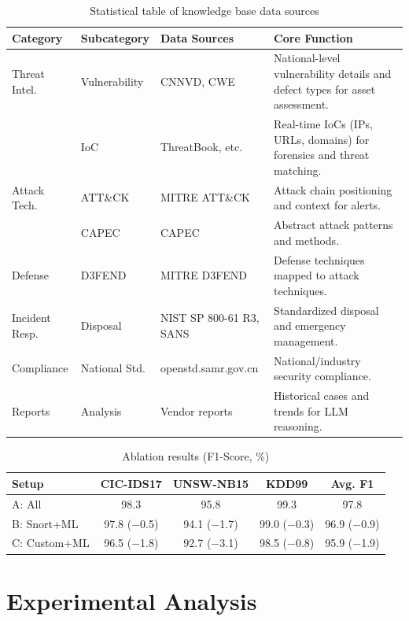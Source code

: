 \documentclass[sigconf,authordraft]{acmart}
\begin{document}
\begin{table}[htbp]
\centering
\caption{Statistical table of knowledge base data sources}
\label{tab:knowledge}
\small
\setlength{\tabcolsep}{4pt}
\begin{tabular}{@{}p{1.4cm}p{1.5cm}p{2.6cm}p{5.2cm}@{}}
\toprule
\textbf{Category} & \textbf{Subcategory} & \textbf{Data Sources} & \textbf{Core Function} \\
\midrule
Threat Intel. & Vulnerability & CNNVD, CWE & National-level vulnerability details and defect types for asset assessment. \\
& IoC & ThreatBook, etc. & Real-time IoCs (IPs, URLs, domains) for forensics and threat matching. \\
Attack Tech. & ATT\&CK & MITRE ATT\&CK & Attack chain positioning and context for alerts. \\
& CAPEC & CAPEC & Abstract attack patterns and methods. \\
Defense & D3FEND & MITRE D3FEND & Defense techniques mapped to attack techniques. \\
Incident Resp. & Disposal & NIST SP 800-61 R3, SANS & Standardized disposal and emergency management. \\
Compliance & National Std. & openstd.samr.gov.cn & National/industry security compliance. \\
Reports & Analysis & Vendor reports & Historical cases and trends for LLM reasoning. \\
\bottomrule
\end{tabular}
\end{table}

\begin{table}[htbp]
\centering
\caption{Ablation results (F1-Score, \%)}
\label{tab:ablation}
\small
\setlength{\tabcolsep}{4pt}
\begin{tabular}{@{}p{2.6cm}cccc@{}}
\toprule
\textbf{Setup} & \textbf{CIC-IDS17} & \textbf{UNSW-NB15} & \textbf{KDD99} & \textbf{Avg. F1} \\
\midrule
A: All & 98.3 & 95.8 & 99.3 & 97.8 \\
B: Snort+ML & 97.8 ($-$0.5) & 94.1 ($-$1.7) & 99.0 ($-$0.3) & 96.9 ($-$0.9) \\
C: Custom+ML & 96.5 ($-$1.8) & 92.7 ($-$3.1) & 98.5 ($-$0.8) & 95.9 ($-$1.9) \\
\bottomrule
\end{tabular}
\end{table}

\section{Experimental Analysis}
\label{sec:experiments}
\end{document}
